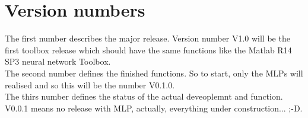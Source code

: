 \section{Version numbers}

The first number describes the major release. Version number V1.0 will be the first toolbox release which should have the same functions like the Matlab R14 SP3 neural network Toolbox.\\

The second number defines the finished functions. So to start, only the MLPs will realised and so this will be the number V0.1.0.\\

The thirs number defines the status of the actual deveoplemnt and function. V0.0.1 means no release with MLP, actually, everything under construction... ;-D.